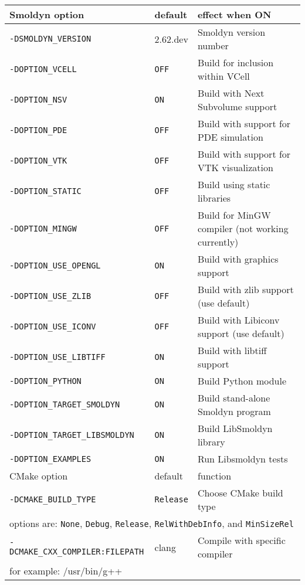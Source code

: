 \documentclass {book}
\begin{document}
\begin{longtable}[c]{lll}
Smoldyn option & default & effect when ON\\
\hline
\texttt{-DSMOLDYN\_VERSION} & 2.62.dev & Smoldyn version number\\
\texttt{-DOPTION\_VCELL} & \texttt{OFF} & Build for inclusion within VCell\\
\texttt{-DOPTION\_NSV} & \texttt{ON} & Build with Next Subvolume support\\
\texttt{-DOPTION\_PDE} & \texttt{OFF} & Build with support for PDE simulation\\
\texttt{-DOPTION\_VTK} & \texttt{OFF} & Build with support for VTK visualization\\
\texttt{-DOPTION\_STATIC} & \texttt{OFF} & Build using static libraries\\
\texttt{-DOPTION\_MINGW} & \texttt{OFF} & Build for MinGW compiler (not working currently)\\
\texttt{-DOPTION\_USE\_OPENGL} & \texttt{ON} & Build with graphics support\\
\texttt{-DOPTION\_USE\_ZLIB} & \texttt{OFF} & Build with zlib support (use default)\\
\texttt{-DOPTION\_USE\_ICONV} & \texttt{OFF} & Build with Libiconv support (use default)\\
\texttt{-DOPTION\_USE\_LIBTIFF} & \texttt{ON} & Build with libtiff support\\
\texttt{-DOPTION\_PYTHON} & \texttt{ON} & Build Python module\\
\texttt{-DOPTION\_TARGET\_SMOLDYN} & \texttt{ON} & Build stand-alone Smoldyn program\\
\texttt{-DOPTION\_TARGET\_LIBSMOLDYN} & \texttt{ON} & Build LibSmoldyn library\\
\texttt{-DOPTION\_EXAMPLES} & \texttt{ON} & Run Libsmoldyn tests\\
\hline
CMake option & default & function\\
\hline
\texttt{-DCMAKE\_BUILD\_TYPE} & \texttt{Release} & Choose CMake build type\\
\multicolumn{3}{l}{\hspace{0.3in}options are: \texttt{None}, \texttt{Debug}, \texttt{Release}, \texttt{RelWithDebInfo}, and \texttt{MinSizeRel}}\\
\texttt{-DCMAKE\_CXX\_COMPILER:FILEPATH} & clang & Compile with specific compiler\\
\multicolumn{3}{l}{\hspace{0.3in}for example: /usr/bin/g++}\\
\end{longtable}
\end{document}
